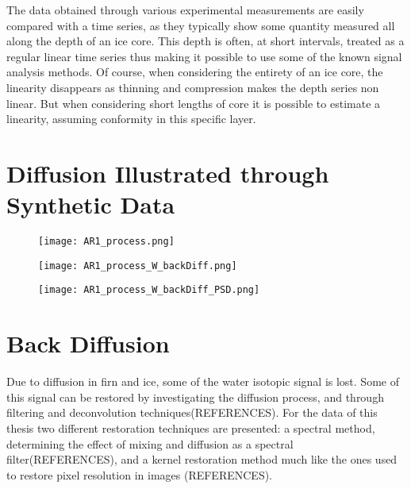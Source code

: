 \documentclass[../../CompleteThesis/Complete_1stDraft]{subfiles}
\begin{document}
	The data obtained through various experimental measurements are easily compared with a time series, as they typically show some quantity measured all along the depth of an ice core. This depth is often, at short intervals, treated as a regular linear time series thus making it possible to use some of the known signal analysis methods. Of course, when considering the entirety of an ice core, the linearity disappears as thinning and compression makes the depth series non linear. But when considering short lengths of core it is possible to estimate a linearity, assuming conformity in this specific layer. 
	
	\section[Synthetic Data]{Diffusion Illustrated through Synthetic Data}
	\label{Sec:SignalAnalysis_SyntheticData}
	
	\begin{figure}[h]
		\centering
		\texttt{[image: AR1\_process.png]}
		\caption[]{}
		\label{fig:AR1_process}
	\end{figure}
	
	\begin{figure}[h]
		\centering
		\texttt{[image: AR1\_process\_W\_backDiff.png]}
		\caption[]{}
		\label{fig:AR1_process_W_backDiff}
	\end{figure}
	
	\begin{figure}[h]
		\centering
		\texttt{[image: AR1\_process\_W\_backDiff\_PSD.png]}
		\caption[]{}
		\label{fig:AR1_process_W_backDiff_PSD}
	\end{figure}
	
	
	
	
	
	
	
	
	\section[Back Diffusion][Back Diffusion]{Back Diffusion}
	\label{Sec:SignalAnalysis_BackDiffusion}
	Due to diffusion in firn and ice, some of the water isotopic signal is lost. Some of this signal can be restored by investigating the diffusion process, and through filtering and deconvolution techniques(REFERENCES).
	For the data of this thesis two different restoration techniques are presented: a spectral method, determining the effect of mixing and diffusion as a spectral filter(REFERENCES), and a kernel restoration method much like the ones used to restore pixel resolution in images (REFERENCES). 
\end{document}
